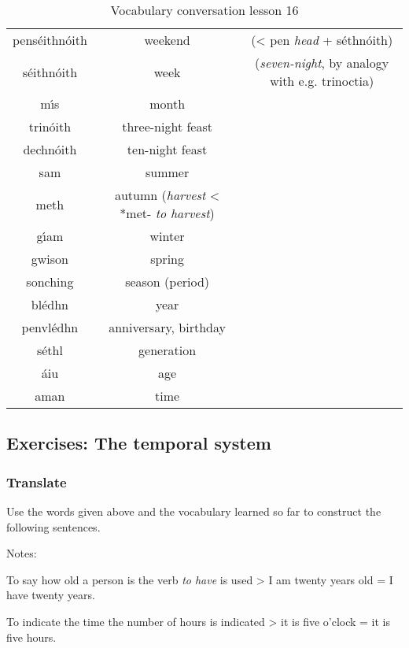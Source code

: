 \begin{table}[H]
\begin{tabular}{ccc}
  \midrule
  pens\'{e}ithn\'{o}ith & weekend & (< pen \textit{head} + s\'{e}thn\'{o}ith)\\
  s\'{e}ithn\'{o}ith & week & (\textit{seven-night}, by analogy with e.g. trinoctia)\\
  m\'{\i}s & month & \\
  \midrule
  trin\'{o}ith & three-night feast & \\
  dechn\'{o}ith & ten-night feast & \\
  \midrule
  sam & summer & \\
  meth & autumn (\textit{harvest} < *met- \textit{to harvest})\\
  g\'{\i}am & winter & \\
  gwison & spring & \\
  \midrule
  sonching & season (period) & \\
  bl\'{e}dhn & year & \\
  penvl\'{e}dhn & anniversary, birthday & \\
  \midrule
  s\'{e}thl & generation & \\
  \'{a}iu & age & \\
  aman & time & \\
  \bottomrule
\end{tabular}
\label{vocab_conversation_lesson16}
\caption{Vocabulary conversation lesson 16}
\end{table}

\subsection{Exercises: The temporal system}

\subsubsection{Translate}

Use the words given above and the vocabulary learned so far to construct the following sentences.

Notes: 

To say how old a person is the verb \textit{to have} is used
> I am twenty years old = I have twenty years.

To indicate the time the number of hours is indicated
> it is five o’clock = it is five hours.

